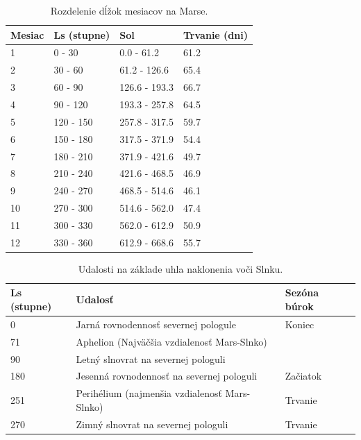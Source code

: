 \begin{table}[!htbp]
\caption{Rozdelenie dĺžok mesiacov na Marse.}
\label{mesiace_dlzka}
\centering
\begin{tabular}{|l|l|l|l|}
\hline 
Mesiac  & Ls (stupne)   & Sol            & Trvanie (dni)    \\ \hline
1       & 0 - 30        & 0.0 - 61.2     & 61.2             \\ \hline
2       & 30 - 60       & 61.2 - 126.6   & 65.4             \\ \hline
3       & 60 - 90       & 126.6 - 193.3  & 66.7             \\ \hline
4       & 90 - 120      & 193.3 - 257.8  & 64.5             \\ \hline
5       & 120 - 150     & 257.8 - 317.5  & 59.7             \\ \hline
6       & 150 - 180     & 317.5 - 371.9  & 54.4             \\ \hline
7       & 180 - 210     & 371.9 - 421.6  & 49.7             \\ \hline
8       & 210 - 240     & 421.6 - 468.5  & 46.9             \\ \hline
9       & 240 - 270     & 468.5 - 514.6  & 46.1             \\ \hline
10      & 270 - 300     & 514.6 - 562.0  & 47.4             \\ \hline
11      & 300 - 330     & 562.0 - 612.9  & 50.9             \\ \hline
12      & 330 - 360     & 612.9 - 668.6  & 55.7             \\ \hline                                        
\end{tabular}
\end{table}

\begin{table}[!htbp]
\caption{Udalosti na základe uhla naklonenia voči Slnku.}
\centering
\begin{tabular}{|l|l|l|}
\hline 
Ls (stupne) & Udalosť                                       & Sezóna búrok     \\ \hline
0           & Jarná rovnodennosť severnej pologule          & Koniec    \\ \hline
71          & Aphelion (Najväčšia vzdialenosť Mars-Slnko)   &           \\ \hline
90          & Letný slnovrat na severnej pologuli           &           \\ \hline
180         & Jesenná rovnodennosť na severnej pologuli     & Začiatok  \\ \hline
251         & Perihélium (najmenšia vzdialenosť Mars-Slnko) & Trvanie   \\ \hline
270         & Zimný slnovrat na severnej pologuli           & Trvanie   \\ \hline                                      
\end{tabular}
\end{table}

